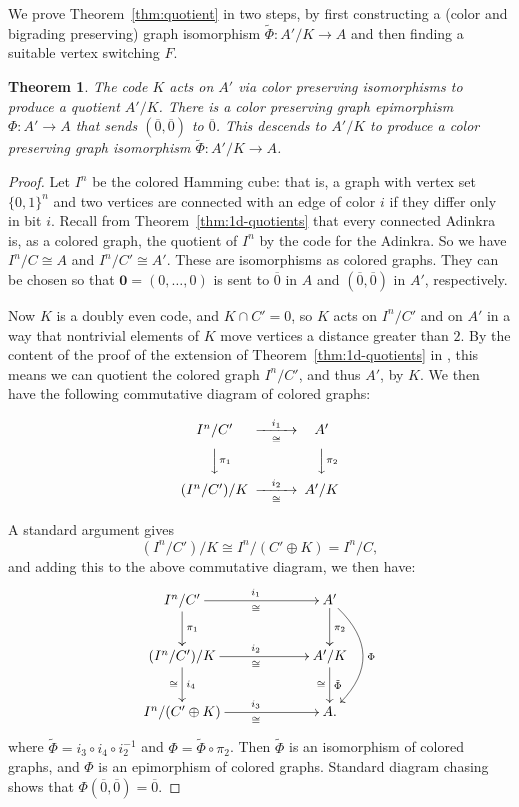 \documentclass[12pt,twoside,singlespace]{article}
\numberwithin{equation}{section}
\newtheorem{thm}[equation]{Theorem}
\theoremstyle{definition}
\renewcommand{\vec}[1]{\mathbf{#1}}
\begin{document}
We prove Theorem~\ref{thm:quotient} in two steps, by first constructing a (color and bigrading preserving) graph isomorphism $\tilde{\Phi}:A'/K\to A$ and then finding a suitable vertex switching $F$.

\begin{thm}
\label{thm:isocolors}
The code $K$ acts on $A'$ via color preserving isomorphisms to produce a quotient $A'/K$.  There is a color preserving graph epimorphism $\Phi:A' \to A$ that sends $(\overline{0},\overline{0})$ to $\overline{0}$.  This descends to $A'/K$ to produce a color preserving graph isomorphism $\tilde{\Phi}:A'/K\to A$.
\end{thm}
\begin{proof}
Let $I^n$ be the colored Hamming cube: that is, a graph with vertex set $\{0,1\}^n$ and two vertices are connected with an edge of color $i$ if they differ only in bit $i$.  Recall from Theorem~\ref{thm:1d-quotients} that every connected Adinkra is, as a colored graph, the quotient of $I^n$ by the code for the Adinkra.  So we have $I^n/C \cong A$ and $I^n/C'\cong A'$. These are isomorphisms as colored graphs.  They can be chosen so that $\vec{0}=(0,\ldots,0)$ is sent to $\overline{0}$ in $A$ and $(\overline{0},\overline{0})$ in $A'$, respectively.

Now $K$ is a doubly even code, and $K\cap C'=0$, so $K$ acts on $I^n/C'$ and on $A'$ in a way that nontrivial elements of $K$ move vertices a distance greater than $2$. By the content of the proof of the extension of Theorem~\ref{thm:1d-quotients} in \cite{zhang:adinkras}, this means we can quotient the colored graph $I^n/C'$, and thus $A'$, by $K$.  We then have the following commutative diagram of colored graphs:

\[
\begin{CD}
I^n/C' @>i_1>\cong> A'\\
@VV\pi_1 V @VV\pi_2 V\\
(I^n/C')/K @>i_2>\cong> A'/K\\
\end{CD}  
\]

A standard argument gives
\[(I^n/C')/K \cong I^n/(C'\oplus K)=I^n/C,\]
and adding this to the above commutative diagram, we then have:
\[
\xymatrixcolsep{5pc}
\xymatrix{
I^n/C' \ar[d]^{\pi_1} \ar[r]^{i_1}_{\cong} &A'\ar[d]^{\pi_2}\ar@/^2pc/[dd]^{\Phi} \\
(I^n/C')/K \ar[d]^{i_4}_{\cong} \ar[r]^{i_2}_\cong &A'/K\ar[d]_{\cong}^{\tilde{\Phi}}\\
I^n/(C'\oplus K) \ar[r]^{i_3}_\cong &A.}
\]
where $\tilde{\Phi}=i_3\circ i_4\circ i_2^{-1}$ and $\Phi=\tilde{\Phi}\circ \pi_2$.  Then $\tilde{\Phi}$ is an isomorphism of colored graphs, and $\Phi$ is an epimorphism of colored graphs.  Standard diagram chasing shows that $\Phi(\overline{0},\overline{0})=\overline{0}$.
\end{proof}
\end{document}
